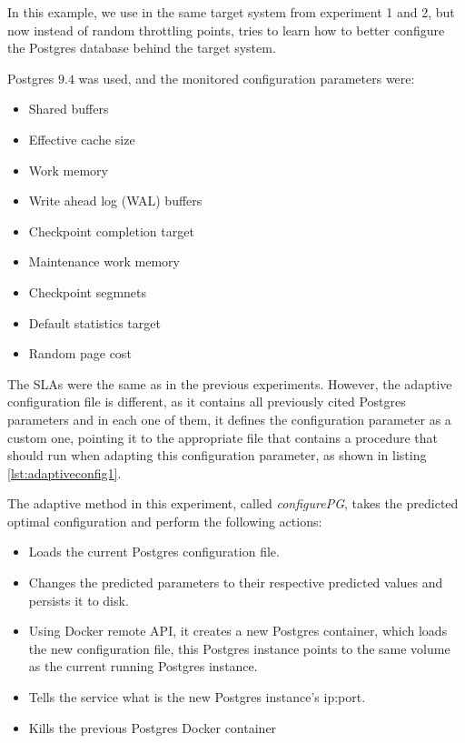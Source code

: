 In this example, we use \projectname{} in the same target system from experiment 1 and 2, but now instead of random throttling points, \projectname{} tries to learn how to better configure the Postgres database behind the target system.

Postgres $9.4$ was used, and the monitored configuration parameters were:

\begin{itemize}
  \item Shared buffers
  \item Effective cache size
  \item Work memory
  \item Write ahead log (WAL) buffers
  \item Checkpoint completion target
  \item Maintenance work memory
  \item Checkpoint segmnets
  \item Default statistics target
  \item Random page cost
\end{itemize}

The SLAs were the same as in the previous experiments. However, the adaptive configuration file is different, as it contains all previously cited Postgres parameters and in each one of them, it defines the configuration parameter as a custom one, pointing it to the appropriate file that contains a procedure that \projectname{} should run when adapting this configuration parameter, as shown in listing \ref{lst:adaptiveconfig1}.

The adaptive method in this experiment, called \emph{configurePG}, takes the predicted optimal configuration and perform the following actions:

\begin{itemize}
\item Loads the current Postgres configuration file.
\item Changes the predicted parameters to their respective predicted values and persists it to disk.
\item Using Docker remote API, it creates a new Postgres container, which loads the new configuration file, this Postgres instance points to the same volume as the current running Postgres instance.
\item Tells the service what is the new Postgres instance's ip:port.
\item Kills the previous Postgres Docker container
\end{itemize}

